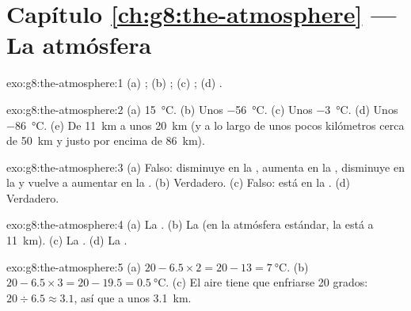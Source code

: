 \section*{Capítulo \ref{ch:g8:the-atmosphere} --- La atmósfera}

\begin{solution}{exo:g8:the-atmosphere:1}
(a) ; (b) ; (c) ; (d) .
\end{solution}

\begin{solution}{exo:g8:the-atmosphere:2}
(a) \qty{15}{\degreeCelsius}. (b) Unos \qty{-56}{\degreeCelsius}.
(c) Unos \qty{-3}{\degreeCelsius}. (d) Unos \qty{-86}{\degreeCelsius}.
(e) De \qty{11}{km} a unos \qty{20}{km} (y a lo largo de unos pocos
kilómetros cerca de \qty{50}{km} y justo por encima de \qty{86}{km}).
\end{solution}

\begin{solution}{exo:g8:the-atmosphere:3}
(a) Falso: disminuye en la , aumenta en la ,
disminuye en la  y vuelve a aumentar en la .
(b) Verdadero. (c) Falso: está en la . (d) Verdadero.
\end{solution}

\begin{solution}{exo:g8:the-atmosphere:4}
(a) La . (b) La  (en la atmósfera estándar, la
 está a \qty{11}{km}). (c) La . (d) La .
\end{solution}

\begin{solution}{exo:g8:the-atmosphere:5}
(a) $20 - 6.5 \times 2 = 20 - 13 = \qty{7}{\degreeCelsius}$. (b) $20 -
6.5 \times 3 = 20 - 19.5 = \qty{0.5}{\degreeCelsius}$. (c) El aire tiene
que enfriarse 20 grados: $20 \div 6.5 \approx 3.1$, así que a unos
\qty{3.1}{km}.
\end{solution}

